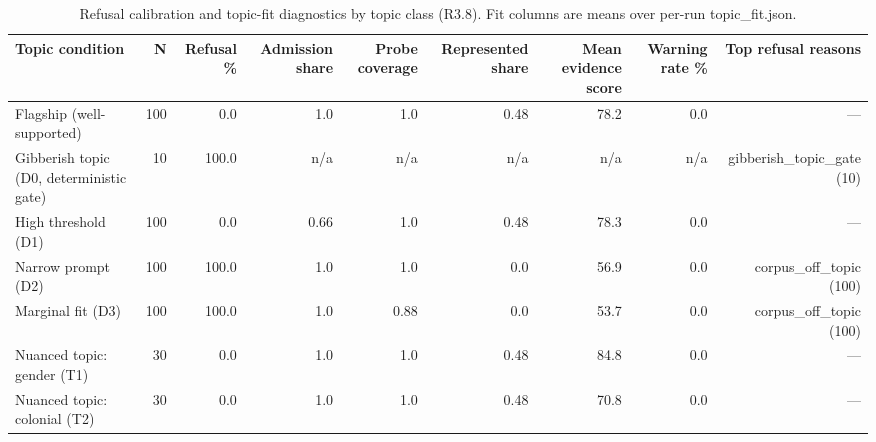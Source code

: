 \begin{table}[ht]
\centering
\caption{Refusal calibration and topic-fit diagnostics by topic class (R3.8). Fit columns are means over per-run topic\_fit.json.}
\begin{tabular}{lrrrrrrrr}
\toprule
Topic condition & N & Refusal \% & Admission share & Probe coverage & Represented share & Mean evidence score & Warning rate \% & Top refusal reasons \\
\midrule
Flagship (well-supported) & 100 & 0.0 & 1.0 & 1.0 & 0.48 & 78.2 & 0.0 & — \\
Gibberish topic (D0, deterministic gate) & 10 & 100.0 & n/a & n/a & n/a & n/a & n/a & gibberish\_topic\_gate (10) \\
High threshold (D1) & 100 & 0.0 & 0.66 & 1.0 & 0.48 & 78.3 & 0.0 & — \\
Narrow prompt (D2) & 100 & 100.0 & 1.0 & 1.0 & 0.0 & 56.9 & 0.0 & corpus\_off\_topic (100) \\
Marginal fit (D3) & 100 & 100.0 & 1.0 & 0.88 & 0.0 & 53.7 & 0.0 & corpus\_off\_topic (100) \\
Nuanced topic: gender (T1) & 30 & 0.0 & 1.0 & 1.0 & 0.48 & 84.8 & 0.0 & — \\
Nuanced topic: colonial (T2) & 30 & 0.0 & 1.0 & 1.0 & 0.48 & 70.8 & 0.0 & — \\
\bottomrule
\end{tabular}
\end{table}
